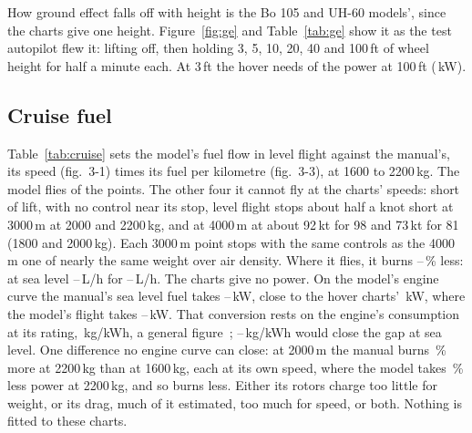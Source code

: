 \documentclass[10pt,a4paper,twocolumn]{article}
\newcommand{\Tab}[1]{}
\begin{document}
How ground effect falls off with height is the Bo 105 and UH-60 models', since the charts give one height. Figure~\ref{fig:ge} and
Table~\ref{tab:ge} show it as the test autopilot flew it: lifting off, then holding 3, 5, 10, 20, 40 and 100\,ft of wheel height for
half a minute each. At 3\,ft the hover needs \NGeLowRatio{} of the power at 100\,ft (\NGeHundredKw\,kW).
\begin{table}[t]
\centering\small
\caption{Ground effect flown by the test autopilot, 2200\,kg, sea level.}\label{tab:ge}
\Tab{ge}
\end{table}

\subsection{Cruise fuel}\label{sec:cruise}
\begin{table}[t]
\centering\small
\caption{Level cruise at the flight manual's speeds (figs.\ 3-1 and 3-3, standard atmosphere; ``Pitch'' the charts' pitch indicator
setting): the fuel flow of the manual and of the model, the model's engine power, and the power at which the model's engine would burn
the manual's fuel.}\label{tab:cruise}
\Tab{cruise}
\end{table}
Table~\ref{tab:cruise} sets the model's fuel flow in level flight against the manual's, its speed (fig.\ 3-1) times its fuel per
kilometre (fig.\ 3-3), at 1600 to 2200\,kg. The model flies \NCrFlown{} of the \NCrN{} points. The other four it cannot fly at
the charts' speeds: short of lift, with no control near its stop, level flight stops about half a knot short at 3000\,m at 2000 and
2200\,kg, and at 4000\,m at about 92\,kt for 98 and 73\,kt for 81 (1800 and 2000\,kg). Each 3000\,m point stops with the same
controls as the 4000\,m one of nearly the same weight over air density. Where it flies, it burns \NCrLessLo--\NCrLessHi\,\% less: at sea level \NCrSeaModelLo--\NCrSeaModelHi\,L/h
for \NCrSeaChartLo--\NCrSeaChartHi\,L/h. The charts give no power. On the model's engine curve the manual's sea level fuel takes
\NCrSeaChartKwLo--\NCrSeaChartKwHi\,kW, close to the hover charts' \NChartKw\,kW, where the model's flight takes
\NCrSeaKwLo--\NCrSeaKwHi\,kW. That conversion rests on the engine's consumption at its rating, \NSfc\,kg/kWh, a general
figure~\cite{wa}; \NCrSeaSfcLo--\NCrSeaSfcHi\,kg/kWh would close the gap at sea level. One difference no engine curve can close: at 2000\,m
the manual burns \NCrWeightChartHi\,\% more at 2200\,kg than at 1600\,kg, each at its own speed, where
the model takes \NCrWeightModelHi\,\% less power at 2200\,kg, and so burns less. Either its rotors charge too little for
weight, or its drag, much of it estimated, too much for speed, or both. Nothing is fitted to these charts.
\end{document}
